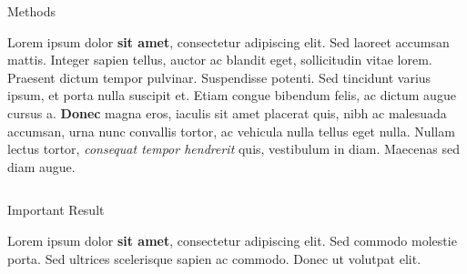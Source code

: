 \documentclass[final]{beamer}
\newlength{\onecolwid}
\newlength{\twocolwid}
\begin{document}
\begin{frame}[t]
\begin{columns}[t]
\begin{column}{\twocolwid}
\begin{columns}[t,totalwidth=\twocolwid]
\begin{column}{\onecolwid}

          \begin{block}{Methods}

            Lorem ipsum dolor \textbf{sit amet}, consectetur adipiscing elit. Sed laoreet
            accumsan mattis. Integer sapien tellus, auctor ac blandit eget, sollicitudin
            vitae lorem. Praesent dictum tempor pulvinar. Suspendisse potenti. Sed tincidunt
            varius ipsum, et porta nulla suscipit et. Etiam congue bibendum felis, ac dictum
            augue cursus a. \textbf{Donec} magna eros, iaculis sit amet placerat quis,
            nibh ac malesuada accumsan, urna nunc convallis tortor, ac vehicula nulla tellus
            eget nulla. Nullam lectus tortor, \textit{consequat tempor hendrerit} quis,
            vestibulum in diam. Maecenas sed diam augue.

          \end{block}


        \end{column} %

      \end{columns} %


      \begin{alertblock}{Important Result}

        Lorem ipsum dolor \textbf{sit amet}, consectetur adipiscing elit. Sed commodo
        molestie porta. Sed ultrices scelerisque sapien ac commodo. Donec ut volutpat
        elit.

      \end{alertblock}


      \begin{columns}[t,totalwidth=\twocolwid] %


\end{columns}
\end{column}
\end{columns}
\end{frame}
\end{document}
